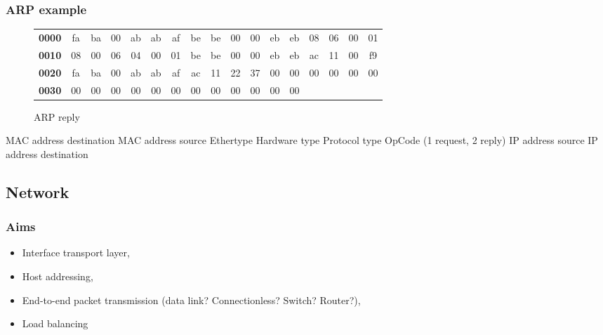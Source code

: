  \begin{frame}
    \frametitle{ARP example}
      \begin{figure}
      \centering
      \resizebox{11.5cm}{!} {
        \begin{tabular}{lcccccccccccccccc}
          \textbf{0000} & \color{red}fa & \color{red}ba & \color{red}00 & \color{red}ab & \color{red}ab & \color{red}af & \color{Marroon}be & \color{Marroon}be & \color{Marroon}00 & \color{Marroon}00 & \color{Marroon}eb & \color{Marroon}eb & \color{blue}08 & \color{blue}06 & \color{magenta}00 & \color{magenta}01 \\
          \textbf{0010} & \color{OliveGreen}08 & \color{OliveGreen}00 & \color{gray}06 & \color{gray}04 & \color{fuchsia}00 & \color{fuchsia}01 & \color{Marroon}be & \color{Marroon}be & \color{Marroon}00 & \color{Marroon}00 & \color{Marroon}eb & \color{Marroon}eb & \color{brown}ac & \color{brown}11 & \color{brown}00 & \color{brown}f9 \\
          \textbf{0020} & \color{red}fa & \color{red}ba & \color{red}00 & \color{red}ab & \color{red}ab & \color{red}af & \color{orange}ac & \color{orange}11 & \color{orange}22 & \color{orange}37 & 00 & 00 & 00 & 00 & 00 & 00 \\
          \textbf{0030} & 00 & 00 & 00 & 00 & 00 & 00 & 00 & 00 & 00 & 00 & 00 & 00 \\
        \end{tabular}
      }
      \caption{ARP reply}
      \label{fig:arp_rep_ex-colored}
    \end{figure}
    \color{red}MAC address destination \color{Marroon}MAC address source \color{blue}Ethertype \color{magenta}Hardware type \color{OliveGreen}Protocol type \color{fuchsia}OpCode (1 request, 2 reply) \color{brown} IP address source \color{orange} IP address destination
  \end{frame}

  \subsection{Network}
  \begin{frame}
    \frametitle{Aims}
      \begin{itemize}
        \item Interface transport layer,\pause
	\item Host addressing,\pause
        \item End-to-end packet transmission (data link? Connectionless? Switch? Router?),\pause
        \item Load balancing
      \end{itemize}
  \end{frame}
